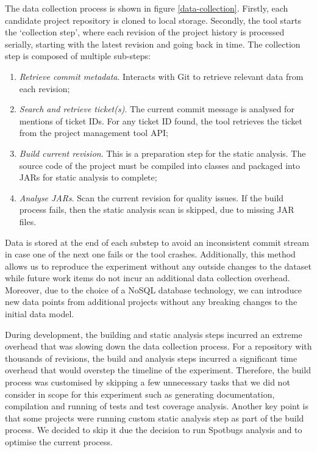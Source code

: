 \documentclass{mpaper}
\begin{document}
The data collection process is shown in figure \ref{data-collection}. Firstly,
each candidate project repository is cloned to local storage. Secondly, the tool
starts the `collection step', where each revision of the project history is
processed serially, starting with the latest revision and going back in time.
The collection step is composed of multiple sub-steps:
\begin{enumerate}
  \item \emph{Retrieve commit metadata}. Interacts with Git to retrieve relevant
  data from each revision;
  \item \emph{Search and retrieve ticket(s)}. The current commit message is
  analysed for mentions of ticket IDs. For any ticket ID found, the tool
  retrieves the ticket from the project management tool API;
  \item \emph{Build current revision}. This is a preparation step for the static
  analysis. The source code of the project must be compiled into classes and
  packaged into JARs for static analysis to complete;
  \item \emph{Analyse JARs}. Scan the current revision for quality issues. If
  the build process fails, then the static analysis scan is skipped, due to
  missing JAR files. 
\end{enumerate}

Data is stored at the end of each substep to avoid an inconsistent commit stream
in case one of the next one fails or the tool crashes. Additionally, this method
allows us to reproduce the experiment without any outside changes to the dataset
while future work items do not incur an additional data collection overhead.
Moreover, due to the choice of a NoSQL database technology, we can introduce new
data points from additional projects without any breaking changes to the initial
data model. 

During development, the building and static analysis steps incurred an extreme
overhead that was slowing down the data collection process. For a repository
with thousands of revisions, the build and analysis steps incurred a significant
time overhead that would overstep the timeline of the experiment. Therefore, the
build process was customised by skipping a few unnecessary tasks that we did not
consider in scope for this experiment such as generating documentation,
compilation and running of tests and test coverage analysis. Another key point
is that some projects were running custom static analysis step as part of the
build process. We decided to skip it due the decision to run Spotbugs analysis
and to optimise the current process. 
\end{document}

